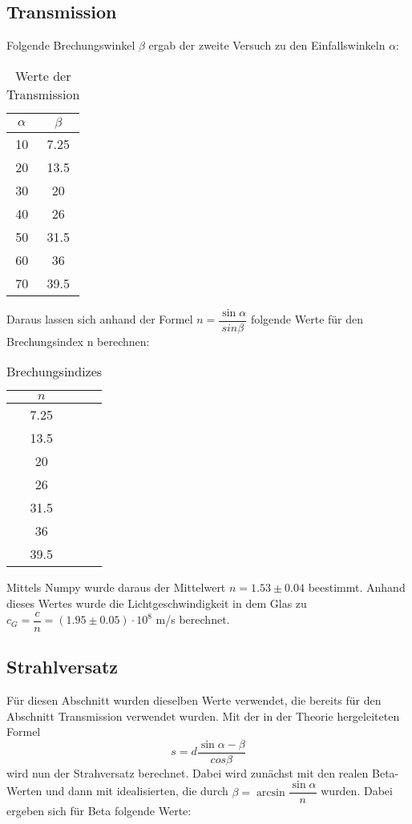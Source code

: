 \subsection{Transmission}
  Folgende Brechungswinkel $\beta$ ergab der zweite Versuch zu den Einfallswinkeln $\alpha$:
  \begin{table}[H]
    \centering
    \caption{Werte der Transmission}
    \begin{tabular}{c c}
      \toprule
      $\alpha$ & $\beta$\\
      \midrule
        10 & 7.25 \\
        20 & 13.5 \\
        30 & 20   \\
        40 & 26   \\
        50 & 31.5 \\
        60 & 36   \\
        70 & 39.5 \\
      \bottomrule
    \end{tabular}
  \end{table}
  \noindent Daraus lassen sich anhand der Formel $n = \dfrac{\sin{\alpha}}{sin{\beta}}$ folgende
  Werte für den Brechungsindex n berechnen:
  \begin{table}[H]
    \centering
    \caption{Brechungsindizes}
    \begin{tabular}{c c}
      \toprule
      $n$\\
      \midrule
        7.25 \\
        13.5 \\
        20   \\
        26   \\
        31.5 \\
        36   \\
        39.5 \\
      \bottomrule
    \end{tabular}
  \end{table}
  \noindent Mittels Numpy wurde daraus der Mittelwert $n=1.53\pm 0.04$ beestimmt. Anhand 
  dieses Wertes wurde die Lichtgeschwindigkeit in dem Glas zu $c_G=\dfrac{c}{n}= (1.95\pm 0.05)
  \cdot 10^{8}$ m/s berechnet.

\subsection{Strahlversatz}
  Für diesen Abschnitt wurden dieselben Werte verwendet, die bereits für den Abschnitt 
  Transmission verwendet wurden.
  Mit der in der Theorie hergeleiteten Formel 
  \begin{equation*}
    s= d\dfrac{\sin{\alpha - \beta}}{cos{\beta}} 
  \end{equation*}
  wird nun der Strahversatz berechnet. Dabei wird zunächst mit den realen Beta-Werten und dann
  mit idealisierten, die durch $\beta=\arcsin{\dfrac{\sin{\alpha}}{n}}$ wurden. Dabei ergeben 
  sich für Beta folgende Werte:

